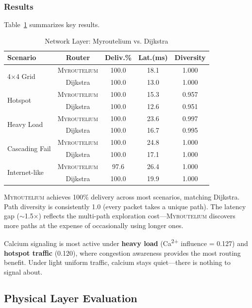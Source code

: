 \documentclass[conference,10pt]{IEEEtran}
\newcommand{\myc}{\textsc{Myroutelium}}
\newcommand{\calcium}{Ca\textsuperscript{2+}}
\begin{document}
\subsubsection{Results}

Table~\ref{tab:network} summarizes key results.

\begin{table}[t]
\centering
\caption{Network Layer: Myroutelium vs. Dijkstra}
\label{tab:network}
\small
\begin{tabular}{lcccc}
\toprule
\textbf{Scenario} & \textbf{Router} & \textbf{Deliv.\%} & \textbf{Lat.(ms)} & \textbf{Diversity} \\
\midrule
\multirow{2}{*}{4$\times$4 Grid} & \myc{} & 100.0 & 18.1 & 1.000 \\
 & Dijkstra & 100.0 & 13.0 & 1.000 \\
\midrule
\multirow{2}{*}{Hotspot} & \myc{} & 100.0 & 15.3 & 0.957 \\
 & Dijkstra & 100.0 & 12.6 & 0.951 \\
\midrule
\multirow{2}{*}{Heavy Load} & \myc{} & 100.0 & 23.6 & 0.997 \\
 & Dijkstra & 100.0 & 16.7 & 0.995 \\
\midrule
\multirow{2}{*}{Cascading Fail} & \myc{} & 100.0 & 24.8 & 1.000 \\
 & Dijkstra & 100.0 & 17.1 & 1.000 \\
\midrule
\multirow{2}{*}{Internet-like} & \myc{} & 97.6 & 26.4 & 1.000 \\
 & Dijkstra & 100.0 & 19.9 & 1.000 \\
\bottomrule
\end{tabular}
\end{table}

\myc{} achieves 100\% delivery across most scenarios, matching Dijkstra. Path diversity is consistently 1.0 (every packet takes a unique path). The latency gap ($\sim$1.5$\times$) reflects the multi-path exploration cost---\myc{} discovers more paths at the expense of occasionally using longer ones.

Calcium signaling is most active under \textbf{heavy load} (\calcium{} influence = 0.127) and \textbf{hotspot traffic} (0.120), where congestion awareness provides the most routing benefit. Under light uniform traffic, calcium stays quiet---there is nothing to signal about.

\subsection{Physical Layer Evaluation}
\end{document}
